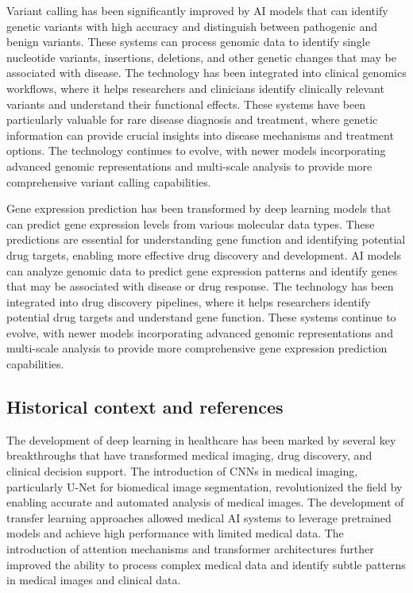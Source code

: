 Variant calling has been significantly improved by AI models that can identify genetic variants with high accuracy and distinguish between pathogenic and benign variants. These systems can process genomic data to identify single nucleotide variants, insertions, deletions, and other genetic changes that may be associated with disease. The technology has been integrated into clinical genomics workflows, where it helps researchers and clinicians identify clinically relevant variants and understand their functional effects. These systems have been particularly valuable for rare disease diagnosis and treatment, where genetic information can provide crucial insights into disease mechanisms and treatment options. The technology continues to evolve, with newer models incorporating advanced genomic representations and multi-scale analysis to provide more comprehensive variant calling capabilities.

Gene expression prediction has been transformed by deep learning models that can predict gene expression levels from various molecular data types. These predictions are essential for understanding gene function and identifying potential drug targets, enabling more effective drug discovery and development. AI models can analyze genomic data to predict gene expression patterns and identify genes that may be associated with disease or drug response. The technology has been integrated into drug discovery pipelines, where it helps researchers identify potential drug targets and understand gene function. These systems continue to evolve, with newer models incorporating advanced genomic representations and multi-scale analysis to provide more comprehensive gene expression prediction capabilities.

\subsection{Historical context and references}

The development of deep learning in healthcare has been marked by several key breakthroughs that have transformed medical imaging, drug discovery, and clinical decision support. The introduction of CNNs in medical imaging, particularly U-Net for biomedical image segmentation, revolutionized the field by enabling accurate and automated analysis of medical images. The development of transfer learning approaches allowed medical AI systems to leverage pretrained models and achieve high performance with limited medical data. The introduction of attention mechanisms and transformer architectures further improved the ability to process complex medical data and identify subtle patterns in medical images and clinical data.

